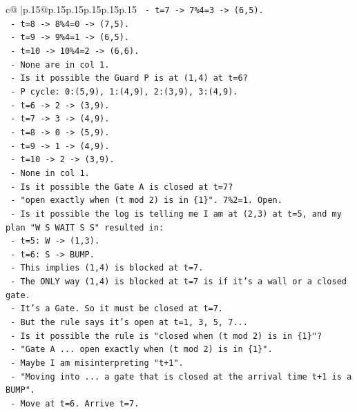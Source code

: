 \documentclass{article}
\begin{document}
{\begin{supertabular}{c@{$\;$}|p{.15\linewidth}@{}p{.15\linewidth}p{.15\linewidth}p{.15\linewidth}p{.15\linewidth}p{.15\linewidth}}
{{{\texttt{  {-} t=7 {-}> 7\%4=3 {-}> (6,5).} \\
\texttt{  {-} t=8 {-}> 8\%4=0 {-}> (7,5).} \\
\texttt{  {-} t=9 {-}> 9\%4=1 {-}> (6,5).} \\
\texttt{  {-} t=10 {-}> 10\%4=2 {-}> (6,6).} \\
\texttt{  {-} None are in col 1.} \\
\texttt{  {-} Is it possible the Guard P is at (1,4) at t=6?} \\
\texttt{  {-} P cycle: 0:(5,9), 1:(4,9), 2:(3,9), 3:(4,9).} \\
\texttt{  {-} t=6 {-}> 2 {-}> (3,9).} \\
\texttt{  {-} t=7 {-}> 3 {-}> (4,9).} \\
\texttt{  {-} t=8 {-}> 0 {-}> (5,9).} \\
\texttt{  {-} t=9 {-}> 1 {-}> (4,9).} \\
\texttt{  {-} t=10 {-}> 2 {-}> (3,9).} \\
\texttt{  {-} None in col 1.} \\
\texttt{  {-} Is it possible the Gate A is closed at t=7?} \\
\texttt{  {-} "open exactly when (t mod 2) is in \{1\}". 7\%2=1. Open.} \\
\texttt{  {-} Is it possible the log is telling me I am at (2,3) at t=5, and my plan "W S WAIT S S" resulted in:} \\
\texttt{    {-} t=5: W {-}> (1,3).} \\
\texttt{    {-} t=6: S {-}> BUMP.} \\
\texttt{    {-} This implies (1,4) is blocked at t=7.} \\
\texttt{    {-} The ONLY way (1,4) is blocked at t=7 is if it's a wall or a closed gate.} \\
\texttt{    {-} It's a Gate. So it must be closed at t=7.} \\
\texttt{    {-} But the rule says it's open at t=1, 3, 5, 7...} \\
\texttt{    {-} Is it possible the rule is "closed when (t mod 2) is in \{1\}"?} \\
\texttt{    {-} "Gate A ... open exactly when (t mod 2) is in \{1\}".} \\
\texttt{    {-} Maybe I am misinterpreting "t+1".} \\
\texttt{    {-} "Moving into ... a gate that is closed at the arrival time t+1 is a BUMP".} \\
\texttt{    {-} Move at t=6. Arrive t=7.} \\
}}}
\end{supertabular}}
\end{document}

